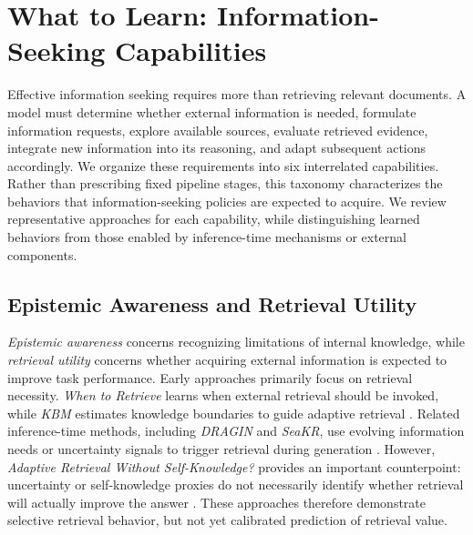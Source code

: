 \section{What to Learn: Information-Seeking Capabilities}
\label{sec:what_to_learn}

Effective information seeking requires more than retrieving relevant documents. A model must determine whether external information is needed, formulate information requests, explore available sources, evaluate retrieved evidence, integrate new information into its reasoning, and adapt subsequent actions accordingly. We organize these requirements into six interrelated capabilities. Rather than prescribing fixed pipeline stages, this taxonomy characterizes the behaviors that information-seeking policies are expected to acquire. We review representative approaches for each capability, while distinguishing learned behaviors from those enabled by inference-time mechanisms or external components.

\subsection{Epistemic Awareness and Retrieval Utility}
\label{sec:epistemic_awareness}

\textit{Epistemic awareness} concerns recognizing limitations of internal knowledge, while \textit{retrieval utility} concerns whether acquiring external information is expected to improve task performance. Early approaches primarily focus on retrieval necessity. \textit{When to Retrieve} learns when external retrieval should be invoked, while \textit{KBM} estimates knowledge boundaries to guide adaptive retrieval \cite{when_to_retrieve,kbm}. Related inference-time methods, including \textit{DRAGIN} and \textit{SeaKR}, use evolving information needs or uncertainty signals to trigger retrieval during generation \cite{dragin,seakr}. However, \textit{Adaptive Retrieval Without Self-Knowledge?} provides an important counterpoint: uncertainty or self-knowledge proxies do not necessarily identify whether retrieval will actually improve the answer \cite{adaptive_retrieval_without_self_knowledge}. These approaches therefore demonstrate selective retrieval behavior, but not yet calibrated prediction of retrieval value.

